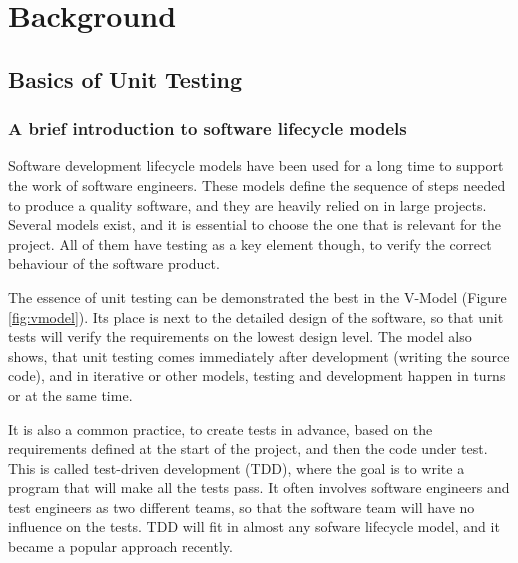 \chapter{Background}
\section{Basics of Unit Testing}

\subsection{A brief introduction to software lifecycle models}
Software development lifecycle models have been used for a long time to support the work of software engineers. These models define the sequence of steps needed to produce a quality software, and they are heavily relied on in large projects. Several models exist, and it is essential to choose the one that is relevant for the project. All of them have testing as a key element though, to verify the correct behaviour of the software product. 

The essence of unit testing can be demonstrated the best in the V-Model (Figure \ref{fig:vmodel}). Its place is next to the detailed design of the software, so that unit tests will verify the requirements on the lowest design level. The model also shows, that unit testing comes immediately after development (writing the source code), and in iterative or other models, testing and development happen in turns or at the same time. \cite{Ruparelia:2010:SDL:1764810.1764814} 

It is also a common practice, to create tests in advance, based on the requirements defined at the start of the project, and then the code under test. This is called test-driven development (TDD), where the goal is to write a program that will make all the tests pass. It often involves software engineers and test engineers as two different teams, so that the software team will have no influence on the tests. TDD will fit in almost any sofware lifecycle model, and it became a popular approach recently. \cite{1510569}


